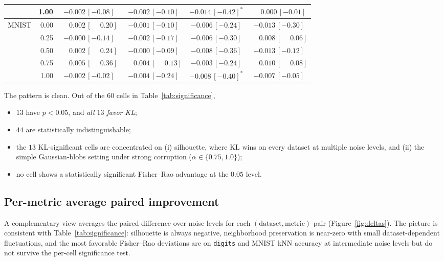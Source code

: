 \documentclass[11pt]{article}
\begin{document}
\begin{table}[t]
\begin{tabular}{lrcccc}
                           & 1.00 & $-0.002\,[-0.08]$ & $-0.002\,[-0.10]$ & $-0.014\,[-0.42]^{*}$ & $\phantom{-}0.000\,[-0.01]$ \\
    \midrule
    \multirow{5}{*}{MNIST}  & 0.00 & $\phantom{-}0.002\,[\phantom{-}0.20]$ & $-0.001\,[-0.10]$ & $-0.006\,[-0.24]$ & $-0.013\,[-0.30]$ \\
                           & 0.25 & $-0.000\,[-0.14]$ & $-0.002\,[-0.17]$ & $-0.006\,[-0.30]$ & $\phantom{-}0.008\,[\phantom{-}0.06]$ \\
                           & 0.50 & $\phantom{-}0.002\,[\phantom{-}0.24]$ & $-0.000\,[-0.09]$ & $-0.008\,[-0.36]$ & $-0.013\,[-0.12]$ \\
                           & 0.75 & $\phantom{-}0.005\,[\phantom{-}0.36]$ & $\phantom{-}0.004\,[\phantom{-}0.13]$ & $-0.003\,[-0.24]$ & $\phantom{-}0.010\,[\phantom{-}0.08]$ \\
                           & 1.00 & $-0.002\,[-0.02]$ & $-0.004\,[-0.24]$ & $-0.008\,[-0.40]^{*}$ & $-0.007\,[-0.05]$ \\
    \bottomrule
  \end{tabular}
\end{table}

The pattern is clean. Out of the $60$ cells in Table~\ref{tab:significance},
\begin{itemize}
  \item $13$ have $p<0.05$, and \emph{all $13$ favor KL};
  \item $44$ are statistically indistinguishable;
  \item the $13$ KL-significant cells are concentrated on (i) silhouette, where KL wins on
        every dataset at multiple noise levels, and (ii) the simple Gaussian-blobs setting
        under strong corruption ($\alpha\in\{0.75, 1.0\}$);
  \item no cell shows a statistically significant Fisher--Rao advantage at the $0.05$ level.
\end{itemize}

\subsection{Per-metric average paired improvement}

A complementary view averages the paired difference over noise levels for each
$(\text{dataset},\text{metric})$ pair (Figure~\ref{fig:deltas}). The picture is consistent with
Table~\ref{tab:significance}: silhouette is always negative, neighborhood preservation is
near-zero with small dataset-dependent fluctuations, and the most favorable Fisher--Rao
deviations are on \texttt{digits} and MNIST kNN accuracy at intermediate noise levels but do
not survive the per-cell significance test.
\end{document}
